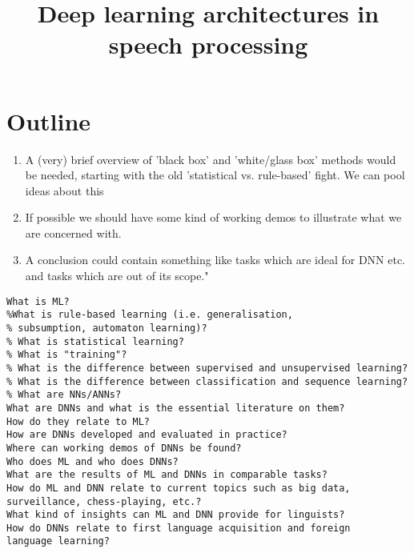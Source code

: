 \documentclass[12pt, titlepage, reqno]{article}
\title{Deep learning architectures in speech processing}
\begin{document}
\maketitle 


\section{Outline}
\begin{enumerate}
	\item A (very) brief overview of 'black box' and 'white/glass box' methods would be needed, starting with the old 'statistical vs. rule-based' fight. We can pool ideas about this
	\item If possible we should have some kind of working demos to illustrate what we are concerned with.
	\item A conclusion could contain something like tasks which are ideal for DNN etc. and tasks which are out of its scope."
\end{enumerate}
\begin{verbatim} 
What is ML?
%What is rule-based learning (i.e. generalisation, 
% subsumption, automaton learning)?
% What is statistical learning?
% What is "training"?
% What is the difference between supervised and unsupervised learning?
% What is the difference between classification and sequence learning?
% What are NNs/ANNs?
What are DNNs and what is the essential literature on them?
How do they relate to ML?
How are DNNs developed and evaluated in practice?
Where can working demos of DNNs be found?
Who does ML and who does DNNs?
What are the results of ML and DNNs in comparable tasks?
How do ML and DNN relate to current topics such as big data, 
surveillance, chess-playing, etc.?
What kind of insights can ML and DNN provide for linguists?
How do DNNs relate to first language acquisition and foreign 
language learning? 

\end{verbatim}
\end{document}
